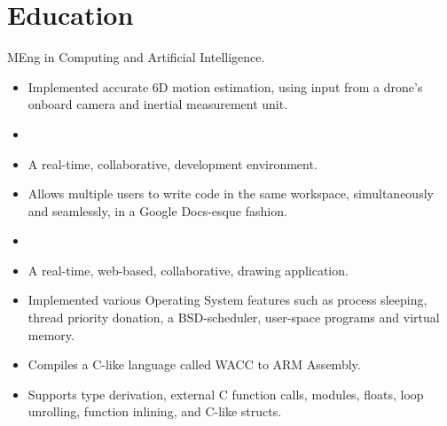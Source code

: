 \documentclass{jcgcv}
\begin{document}
\begin{column}

\section{Education}
MEng in Computing and Artificial Intelligence.

\begin{adjustwidth}{0.3cm}{}

\begin{itemize}
  \item Implemented accurate 6D motion estimation, using input from a drone's onboard camera and inertial measurement unit.
\end{itemize}

\begin{itemize}
  \item {}
  \item A real-time, collaborative, development environment.
  \item Allows multiple users to write code in the same workspace, simultaneously and seamlessly, in a Google Docs-esque fashion.
\end{itemize}

\begin{itemize}
  \item {}
  \item A real-time, web-based, collaborative, drawing application.
\end{itemize}

\begin{itemize}
  \item Implemented various Operating System features such as process sleeping, thread priority donation, a BSD-scheduler, user-space programs and virtual memory.
\end{itemize}

\begin{itemize}
  \item Compiles a C-like language called WACC to ARM Assembly.
  \item Supports type derivation, external C function calls, modules, floats, loop unrolling, function inlining, and C-like structs.
\end{itemize}


\end{adjustwidth}
\end{column}
\end{document}
